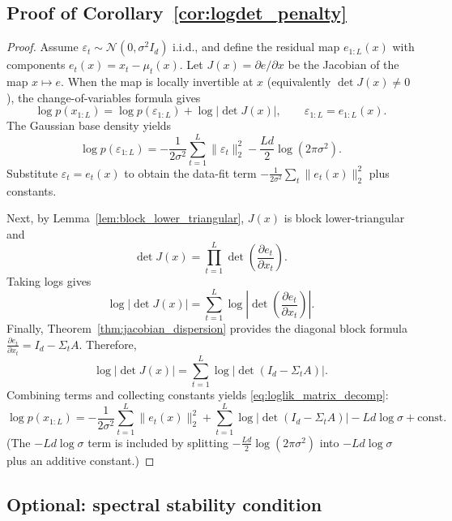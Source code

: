 \documentclass[11pt]{article}
\begin{document}
\subsection{Proof of Corollary~\ref{cor:logdet_penalty}}
\label{app:proof_cor_logdet}

\begin{proof}
Assume $\varepsilon_t\sim\mathcal{N}(0,\sigma^2 I_d)$ i.i.d., and define the residual map
$e_{1:L}(x)$ with components $e_t(x)=x_t-\mu_t(x)$.
Let $J(x)=\partial e/\partial x$ be the Jacobian of the map $x\mapsto e$.
When the map is locally invertible at $x$ (equivalently $\det J(x)\neq 0$), the change-of-variables
formula gives
\begin{equation}
\log p(x_{1:L})
=
\log p(\varepsilon_{1:L})
+
\log\left|\det J(x)\right|,
\qquad \varepsilon_{1:L}=e_{1:L}(x).
\label{eq:cov_general_app}
\end{equation}
The Gaussian base density yields
\[
\log p(\varepsilon_{1:L})
=
-\frac{1}{2\sigma^2}\sum_{t=1}^L \|\varepsilon_t\|_2^2
-\frac{Ld}{2}\log(2\pi\sigma^2).
\]
Substitute $\varepsilon_t=e_t(x)$ to obtain the data-fit term
$-\frac{1}{2\sigma^2}\sum_t\|e_t(x)\|_2^2$ plus constants.

Next, by Lemma~\ref{lem:block_lower_triangular}, $J(x)$ is block lower-triangular and
\[
\det J(x) = \prod_{t=1}^L \det\!\left(\frac{\partial e_t}{\partial x_t}\right).
\]
Taking logs gives
\[
\log|\det J(x)|=\sum_{t=1}^L \log\left|\det\!\left(\frac{\partial e_t}{\partial x_t}\right)\right|.
\]
Finally, Theorem~\ref{thm:jacobian_dispersion} provides the diagonal block formula
$\frac{\partial e_t}{\partial x_t}=I_d-\Sigma_tA$.
Therefore,
\[
\log|\det J(x)|
=
\sum_{t=1}^L \log\left|\det\!\left(I_d-\Sigma_tA\right)\right|.
\]
Combining terms and collecting constants yields \eqref{eq:loglik_matrix_decomp}:
\[
\log p(x_{1:L})
=
-\frac{1}{2\sigma^2}\sum_{t=1}^L\|e_t(x)\|_2^2
+
\sum_{t=1}^L\log\left|\det(I_d-\Sigma_tA)\right|
-
Ld\log\sigma
+\mathrm{const}.
\]
(The $-Ld\log\sigma$ term is included by splitting $-\frac{Ld}{2}\log(2\pi\sigma^2)$ into $-Ld\log\sigma$
plus an additive constant.)
\end{proof}

\subsection{Optional: spectral stability condition}
\label{app:spectral_condition}
\end{document}
